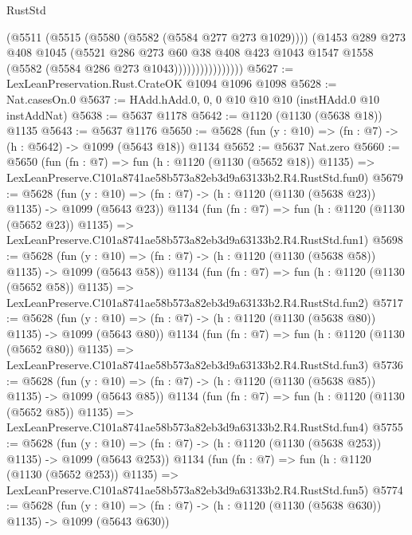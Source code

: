 \begin{lexlean}{RustStd}
\begin{coremodule}
                          (@5511
                            (@5515 (@5580 (@5582 (@5584 @277 @273 @1029))))
                            (@1453
                              @289
                              @273
                              @408
                              @1045
                              (@5521
                                @286
                                @273
                                @60
                                @38
                                @408
                                @423
                                @1043
                                @1547
                                @1558
                                (@5582 (@5584 @286 @273 @1043))))))))))))))))
@5627 := LexLeanPreservation.Rust.CrateOK @1094 @1096 @1098
@5628 := Nat.casesOn.{0}
@5637 := HAdd.hAdd.{0, 0, 0} @10 @10 @10 (instHAdd.{0} @10 instAddNat)
@5638 := @5637 @1178
@5642 := @1120 (@1130 (@5638 @18)) @1135
@5643 := @5637 @1176
@5650 := @5628 (fun (y : @10) => (fn : @7) -> (h : @5642) -> @1099 (@5643 @18)) @1134
@5652 := @5637 Nat.zero
@5660 := @5650
    (fun (fn : @7) =>
    fun (h : @1120 (@1130 (@5652 @18)) @1135) =>
    LexLeanPreserve.C101a8741ae58b573a82eb3d9a63133b2.R4.RustStd.fun0)
@5679 := @5628
    (fun (y : @10) => (fn : @7) -> (h : @1120 (@1130 (@5638 @23)) @1135) -> @1099 (@5643 @23))
    @1134
    (fun (fn : @7) =>
    fun (h : @1120 (@1130 (@5652 @23)) @1135) =>
    LexLeanPreserve.C101a8741ae58b573a82eb3d9a63133b2.R4.RustStd.fun1)
@5698 := @5628
    (fun (y : @10) => (fn : @7) -> (h : @1120 (@1130 (@5638 @58)) @1135) -> @1099 (@5643 @58))
    @1134
    (fun (fn : @7) =>
    fun (h : @1120 (@1130 (@5652 @58)) @1135) =>
    LexLeanPreserve.C101a8741ae58b573a82eb3d9a63133b2.R4.RustStd.fun2)
@5717 := @5628
    (fun (y : @10) => (fn : @7) -> (h : @1120 (@1130 (@5638 @80)) @1135) -> @1099 (@5643 @80))
    @1134
    (fun (fn : @7) =>
    fun (h : @1120 (@1130 (@5652 @80)) @1135) =>
    LexLeanPreserve.C101a8741ae58b573a82eb3d9a63133b2.R4.RustStd.fun3)
@5736 := @5628
    (fun (y : @10) => (fn : @7) -> (h : @1120 (@1130 (@5638 @85)) @1135) -> @1099 (@5643 @85))
    @1134
    (fun (fn : @7) =>
    fun (h : @1120 (@1130 (@5652 @85)) @1135) =>
    LexLeanPreserve.C101a8741ae58b573a82eb3d9a63133b2.R4.RustStd.fun4)
@5755 := @5628
    (fun (y : @10) => (fn : @7) -> (h : @1120 (@1130 (@5638 @253)) @1135) -> @1099 (@5643 @253))
    @1134
    (fun (fn : @7) =>
    fun (h : @1120 (@1130 (@5652 @253)) @1135) =>
    LexLeanPreserve.C101a8741ae58b573a82eb3d9a63133b2.R4.RustStd.fun5)
@5774 := @5628
    (fun (y : @10) => (fn : @7) -> (h : @1120 (@1130 (@5638 @630)) @1135) -> @1099 (@5643 @630))

\end{coremodule}
\end{lexlean}
